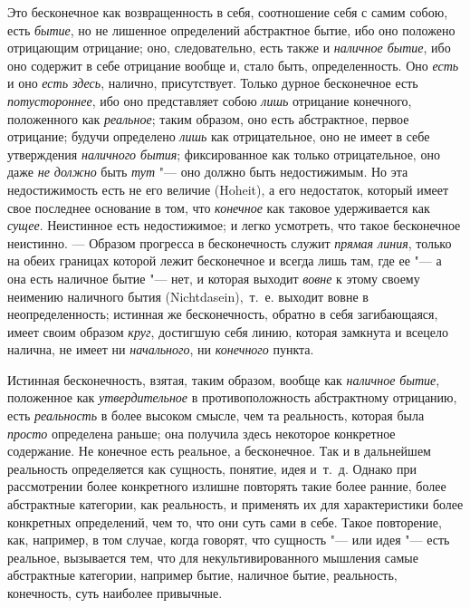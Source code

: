 Это бесконечное как возвращенность в себя, соотношение себя с самим собою,
есть {\em бытие}, но не лишенное определений
абстрактное бытие, ибо оно положено отрицающим отрицание; оно,
следовательно, есть также и {\em наличное бытие}, ибо
оно содержит в себе отрицание вообще и, стало быть, определенность. Оно
{\em есть} и оно {\em есть здесь},
налично, присутствует. Только дурное бесконечное есть
{\em потустороннее}, ибо оно представляет собою
{\em лишь} отрицание конечного, положенного как
{\em реальное}; таким образом, оно есть абстрактное,
первое отрицание; будучи определено {\em лишь} как
отрицательное, оно не имеет в себе утверждения
{\em наличного бытия}; фиксированное как только
отрицательное, оно даже {\em не должно} быть
{\em тут} "--- оно должно быть недостижимым. Но эта
недостижимость есть не его величие (Hoheit), а его недостаток, который
имеет свое последнее основание в том, что
{\em конечное} как таковое удерживается как
{\em сущее}. Неистинное есть недостижимое; и легко
усмотреть, что такое бесконечное неистинно. — Образом прогресса в
бесконечность служит {\em прямая линия}, только на
обеих границах которой лежит бесконечное и всегда лишь там, где ее "--- а она
есть наличное бытие "--- нет, и которая выходит
{\em вовне} к этому своему неимению наличного бытия
(Nichtdasein),~т.~е. выходит вовне в неопределенность; истинная же
бесконечность, обратно в себя загибающаяся, имеет своим образом
{\em круг}, достигшую себя линию, которая замкнута и
всецело налична, не имеет ни {\em начального}, ни
{\em конечного} пункта.

Истинная бесконечность, взятая, таким образом, вообще как
{\em наличное бытие}, положенное как
{\em утвердительное} в противоположность абстрактному
отрицанию, есть {\em реальность} в более высоком
смысле, чем та реальность, которая была {\em просто}
определена раньше; она получила здесь некоторое конкретное содержание. Не
конечное есть реальное, а бесконечное. Так и в дальнейшем реальность
определяется как сущность, понятие, идея и~т.~д. Однако при рассмотрении
более конкретного излишне повторять такие более ранние, более абстрактные
категории, как реальность, и применять их для характеристики более
конкретных определений, чем то, что они суть сами в себе. Такое повторение,
как, например, в том случае, когда говорят, что сущность "--- или идея "--- есть
реальное, вызывается тем, что для некультивированного мышления самые
абстрактные категории, например бытие, наличное бытие, реальность,
конечность, суть наиболее привычные.

